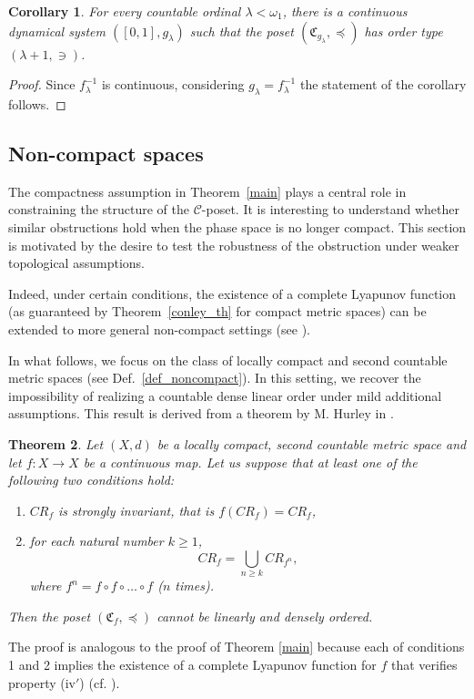\documentclass[pdflatex,sn-mathphys-num]{sn-jnl}
\theoremstyle{thmstyleone}%
\newtheorem{thm}{Theorem}
\newtheorem{cor}[thm]{Corollary}
\theoremstyle{thmstyletwo}%
\theoremstyle{thmstylethree}%
\begin{document}
\begin{cor}\label{cor_on_bijective_function}
For every countable ordinal $ \lambda<\omega_1$, there is a continuous dynamical system $([0,1],g_\lambda)$ such that
the poset $(\mathfrak{C}_{g_\lambda},\preceq)$ has order type $(\lambda+1, \ni)$.

\end{cor}
\begin{proof} Since $f^{-1}_\lambda$ is continuous, considering $g_\lambda=f^{-1}_\lambda$ the statement of the corollary follows.
\end{proof}

\subsection{Non-compact spaces}
The compactness assumption in Theorem~\ref{main} plays a central role in constraining the structure of the ${\mathcal C}$-poset. It is interesting to understand whether similar obstructions hold when the phase space is no longer compact. This section is motivated by the desire to test the robustness of the obstruction under weaker topological assumptions.

\noindent Indeed, under certain conditions, the existence of a complete Lyapunov function (as guaranteed by Theorem~\ref{conley_th} for compact metric spaces) can be extended to more general non-compact settings (see \cite{hu91, hu92, hu98}).

\noindent In what follows, we focus on the class of locally compact and second countable metric spaces (see Def.~\ref{def_noncompact}). In this setting, we recover the impossibility of realizing a countable dense linear order under mild additional assumptions. This result is derived from a theorem by M. Hurley in \cite{hu91}.

\begin{thm}\label{th_cc_loccomp} Let $(X,d)$ be a locally compact, second countable metric space and let $f:X\to X$ be a continuous map. Let us suppose that at least one of the following two conditions hold:
\begin{enumerate}
\item[1.] $CR_f$ is strongly invariant, that is $f(CR_f)=CR_f$,
\item[2.] for each natural number $k\geq 1$,
\[
CR_f=\bigcup_{n\geq k}CR_{f^n},
\]
where $f^n=f\circ f\circ\ldots\circ f$ ($n$ times).
\end{enumerate}
Then the poset $(\mathfrak{C}_f,\preceq)$ cannot be linearly and densely ordered.
\end{thm}
\noindent The proof is analogous to the proof of Theorem \ref{main} because each of conditions 1 and 2 implies the existence of a complete Lyapunov function for $f$ that verifies property (iv$'$) (cf. \cite[Theorem~4.0, p.~720, and Theorem~8.2, p.~727]{hu91}).
\end{document}
